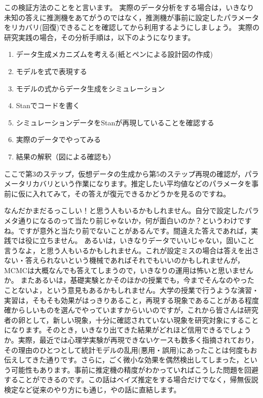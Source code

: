 \documentclass{ltjsbook}
\begin{document}
この検証方法のことをと言います。
実際のデータ分析をする場合は，いきなり未知の答えに推測機をあてがうのではなく，推測機が事前に設定したパラメータをリカバリ(回復)できることを確認してから利用するようにしましょう。
実際の研究実践の場合，その分析手順は，以下のようになります。
\begin{enumerate}
    \item データ生成メカニズムを考える(紙とペンによる設計図の作成)
    \item モデルを式で表現する
    \item モデルの式からデータ生成をシミュレーション
    \item Stanでコードを書く
    \item シミュレーションデータをStanが再現していることを確認する
    \item 実際のデータでやってみる
    \item 結果の解釈（図による確認も）
\end{enumerate}
ここで第3のステップ，仮想データの生成から第5のステップ再現の確認が，パラメータリカバリという作業になります。推定したい平均値などのパラメータを事前に仮に入れてみて，その答えが復元できるかどうかを見るのですね。

なんだかまだるっこしい！と思う人もいるかもしれません。自分で設定したパラメタ通りになるのって当たり前じゃないか，何が面白いのか？というわけですね。ですが意外と当たり前でないことがあるんです。間違えた答えであれば，実践では役に立ちません。
あるいは，いきなりデータでいいじゃない，固いこと言うなよ，と思う人もいるかもしれません。これが設定ミスの場合は答えを出さない・答えられないという機械であればそれでもいいのかもしれませんが，MCMCは大概なんでも答えてしまうので，いきなりの運用は怖いと思いませんか。
またあるいは，基礎実験とかそのほかの授業でも，今までそんなのやったことないよ，という意見もあるかもしれません。大学の授業で行うような演習・実習は，そもそも効果がはっきりあること，再現する現象であることがある程度確からしいものを選んでやっていますからいいのですが，これから皆さんは研究者の卵として，新しい現象，十分に確認されていない現象を研究対象にすることになります。そのとき，いきなり出てきた結果がどれほど信用できるでしょうか。実際，最近では心理学実験が再現できないケースも数多く指摘されており，その理由のひとつとして統計モデルの乱用(悪用・誤用)にあったことは何度もお伝えしてきた通りです。さらに，ごく微小な効果を偶然検出してしまった，という可能性もあります。事前に推定機の精度がわかっていればこうした問題を回避することができるのです。この話はベイズ推定をする場合だけでなく，帰無仮説検定など従来のやり方にも通じ，やの話に直結します。
\end{document}

